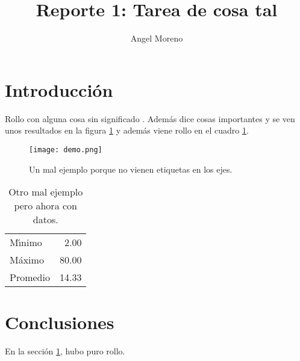 \documentclass{article} %
\title{Reporte 1: Tarea de cosa tal} %
\author{Angel Moreno} %
\begin{document}
\maketitle %

\section{Introducci\'{o}n}\label{intro} %

Rollo con alguna cosa sin significado \citep{libro}.
Adem\'{a}s \citet{art} dice cosas importantes y se ven unos resultados
en la figura \ref{fig} y adem\'{a}s viene rollo en el cuadro \ref{datos}.

\begin{figure}
  \centering\texttt{[image: demo.png]}
  \caption{Un mal ejemplo porque no vienen etiquetas en los ejes.}
  \label{fig}
\end{figure}

\begin{table}
  \caption{Otro mal ejemplo pero ahora con datos.}
  \label{datos}
  \begin{center}
    \begin{tabular}{lr}
      M\'{\i}nimo & 2.00 \\
      M\'{a}ximo & 80.00 \\
      Promedio & 14.33
    \end{tabular}
  \end{center}
\end{table}

\section{Conclusiones}

En la secci\'{o}n \ref{intro}, hubo puro rollo. \citep{armella2002instrumentos}



\end{document}
